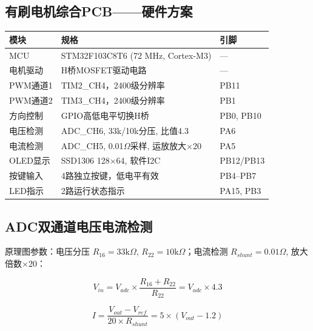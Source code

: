 \documentclass[12pt,a4paper]{ctexart}
\begin{document}
\subsection{有刷电机综合PCB——硬件方案}

\begin{center}
\begin{tabular}{lll}
\toprule
\textbf{模块} & \textbf{规格} & \textbf{引脚} \\
\midrule
MCU          & STM32F103C8T6 (72 MHz, Cortex-M3) & --- \\
电机驱动     & H桥MOSFET驱动电路 & --- \\
PWM通道1     & TIM2\_CH4，2400级分辨率 & PB11 \\
PWM通道2     & TIM3\_CH4，2400级分辨率 & PB1 \\
方向控制     & GPIO高低电平切换H桥 & PB0, PB10 \\
电压检测     & ADC\_CH6, 33k/10k分压, 比值4.3 & PA6 \\
电流检测     & ADC\_CH5, 0.01$\Omega$采样, 运放放大$\times$20 & PA5 \\
OLED显示     & SSD1306 128$\times$64, 软件I2C & PB12/PB13 \\
按键输入     & 4路独立按键，低电平有效 & PB4--PB7 \\
LED指示      & 2路运行状态指示 & PA15, PB3 \\
\bottomrule
\end{tabular}
\end{center}

\subsection{ADC双通道电压电流检测}

原理图参数：电压分压 $R_{16}=33\text{k}\Omega$, $R_{22}=10\text{k}\Omega$；电流检测 $R_{shunt}=0.01\Omega$, 放大倍数$\times$20：

\begin{equation}
    V_{in} = V_{adc} \times \frac{R_{16} + R_{22}}{R_{22}} = V_{adc} \times 4.3
\end{equation}

\begin{equation}
    I = \frac{V_{out} - V_{ref}}{20 \times R_{shunt}} = 5 \times (V_{out} - 1.2)
\end{equation}
\end{document}
